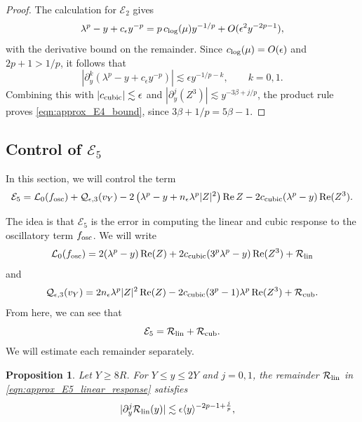 \documentclass[11pt]{amsart}
\newtheorem{proposition}[theorem]{Proposition}
\theoremstyle{definition}
\theoremstyle{remark}
\numberwithin{equation}{section}
\newcommand{\mc}[1]{\mathcal{#1}}
\newcommand{\ang}[1]{\langle #1 \rangle}
\begin{document}
\begin{proof}
    The calculation for $\mc{E}_2$ gives
    \[\lambda^p-y+c_\epsilon y^{-p}
      =p\,c_{\textup{log}}(\mu)y^{-1/p}+O(\epsilon^2y^{-2p-1}),\]
    with the derivative bound on the remainder. Since $c_{\textup{log}}(\mu)=O(\epsilon)$ and $2p+1>1/p$, it follows that
    \[\left|\partial_y^k\left(\lambda^p-y+c_\epsilon y^{-p}\right)\right|
      \lesssim\epsilon y^{-1/p-k},\qquad k=0,1.\]
    Combining this with $|c_{\textup{cubic}}|\lesssim\epsilon$ and $|\partial_y^j(Z^3)|\lesssim y^{-3\beta+j/p}$, the product rule proves \eqref{eqn:approx_E4_bound}, since $3\beta+1/p=5\beta-1$.
\end{proof}

\subsection{Control of \texorpdfstring{$\mc{E}_5$}{E5}}

In this section, we will control the term
\[\mc{E}_5=\mc{L}_0(f_{\textup{osc}})+\mc{Q}_{\epsilon,3}(v_Y)-2\left(\lambda^p-y+n_\epsilon\lambda^p|Z|^2\right)\operatorname{Re}Z
        -2c_{\textup{cubic}}(\lambda^p-y)\operatorname{Re}(Z^3).\]

The idea is that $\mc{E}_5$ is the error in computing the linear and cubic response to the oscillatory term $f_{\textup{osc}}$. We will write
\begin{equation}\label{eqn:approx_E5_linear_response}
\mc{L}_0(f_{\textup{osc}}) = 2(\lambda^p - y)\operatorname{Re}(Z) + 2c_{\textup{cubic}}(3^p\lambda^p - y)\operatorname{Re}(Z^3) + \mc{R}_{\textup{lin}}
\end{equation}
and 
\begin{equation}\label{eqn:approx_E5_cubic_response}
\mc{Q}_{\epsilon,3}(v_Y) = 2n_\epsilon\lambda^p|Z|^2\operatorname{Re}(Z) - 2c_{\textup{cubic}}(3^p-1)\lambda^p\operatorname{Re}(Z^3) + \mc{R}_{\textup{cub}}.
\end{equation}
From here, we can see that 
\[\mc{E}_5 = \mc{R}_{\textup{lin}} + \mc{R}_{\textup{cub}}.\]
We will estimate each remainder separately. 

\begin{proposition}\label{prop:approx_E5_linear}
    Let $Y\geq8R$. For $Y\leq y\leq2Y$ and $j=0,1$, the remainder $\mc{R}_{\textup{lin}}$ in \eqref{eqn:approx_E5_linear_response} satisfies
    \begin{align}
        |\partial_y^j\mc{R}_{\textup{lin}}(y)|
        &\lesssim\epsilon\ang{y}^{-2p-1+\frac{j}{p}},
        \label{eqn:approx_E5_linear_remainder}
    \end{align}
\end{proposition}
\end{document}
